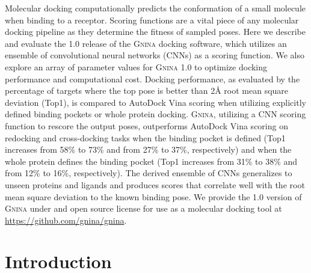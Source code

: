 \documentclass[linenumbers,doublespacing]{bmcart}
\begin{document}
\begin{frontmatter}
\begin{abstractbox}
Molecular docking computationally predicts the conformation of a small molecule when binding to a receptor. Scoring functions are a vital piece of any molecular docking pipeline as they determine the fitness of sampled poses. Here we describe and evaluate the 1.0 release of the \textsc{Gnina} docking software, which utilizes an ensemble of convolutional neural networks (CNNs) as a scoring function. We also explore an array of parameter values for \textsc{Gnina} 1.0 to optimize docking performance and computational cost. Docking performance, as evaluated by the percentage of targets where the top pose is better than 2{\AA} root mean square deviation (Top1), is compared to AutoDock Vina scoring when utilizing explicitly defined binding pockets or whole protein docking. \textsc{Gnina}, utilizing a CNN scoring function to rescore the output poses, outperforms AutoDock Vina scoring on redocking and cross-docking tasks when the binding pocket is defined (Top1 increases from 58\% to 73\% and from 27\% to 37\%, respectively) and when the whole protein defines the binding pocket (Top1 increases from 31\% to 38\% and from 12\% to 16\%, respectively). The derived ensemble of CNNs generalizes to unseen proteins and ligands and produces scores that correlate well with the root mean square deviation to the known binding pose. We provide the 1.0 version of \textsc{Gnina} under and open source license for use as a molecular docking tool at \url{https://github.com/gnina/gnina}.

\begin{keyword}
\end{keyword}

\end{abstractbox}

\end{frontmatter}
\section{Introduction}
\end{document}
